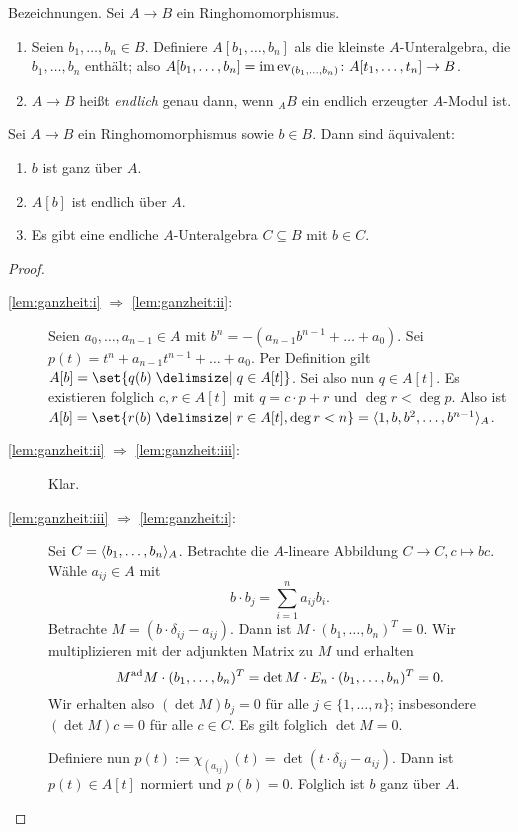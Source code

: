 \documentclass[12pt,a4paper]{scrartcl}
\theoremstyle{cplain}
\theoremstyle{cdef}
\begin{document}
\medskip

Bezeichnungen. Sei $A\to B$ ein Ringhomomorphismus.
\begin{enumerate}
	\item Seien $b_1,\dots,b_n\in B$. Definiere $A[b_1,\dots, b_n]$ als die kleinste $A$-Unteralgebra, die $b_1,\dots, b_n$ enthält; also $A[b_1,\dots, b_n] = \operatorname{im} \operatorname{ev}_{(b_1,\dots, b_n)}\colon A[t_1,\dots, t_n]\to B$.
	\item $A\to B$ heißt \emph{endlich} genau dann, wenn ${}_AB$ ein endlich erzeugter $A$-Modul ist.
\end{enumerate}

\begin{lem} \label{lem:ganzheit}
	Sei $A\to B$ ein Ringhomomorphismus sowie $b\in B$. Dann sind äquivalent:
	\begin{enumerate}
		\item $b$ ist ganz über $A$. \label{lem:ganzheit:i}
		\item $A[b]$ ist endlich über $A$. \label{lem:ganzheit:ii}
		\item Es gibt eine endliche $A$-Unteralgebra $C\subseteq B$ mit $b\in C$. \label{lem:ganzheit:iii}
	\end{enumerate}
\end{lem}


\begin{proof}
	\leavevmode
	\begin{description}
		\item[\ref{lem:ganzheit:i} $\Rightarrow$ \ref{lem:ganzheit:ii}:] Seien $a_0,\dots, a_{n-1}\in A$ mit $b^n = -(a_{n-1}b^{n-1}+\dots+a_0)$. Sei $p(t) = t^n+a_{n-1}t^{n-1}+\dots + a_0$. Per Definition gilt $A[b] = \set{q(b)\given q\in A[t]}$. Sei also nun $q\in A[t]$. Es existieren folglich $c,r\in A[t]$ mit $q = c\cdot p +r $ und $\deg r < \deg p$. Also ist $A[b] = \set{r(b)\given r\in A[t], \deg r <n} = \<1, b, b^2,\dots, b^{n-1}\>_A$.
		
		\item[\ref{lem:ganzheit:ii} $\Rightarrow$ \ref{lem:ganzheit:iii}:] Klar.
		\item[\ref{lem:ganzheit:iii} $\Rightarrow$ \ref{lem:ganzheit:i}:] Sei $C = \langle b_1, \dots, b_n\rangle_A$. Betrachte die $A$-lineare Abbildung $C\to C, c\mapsto bc$. Wähle $a_{ij}\in A$ mit 
		\[b\cdot b_j = \sum_{i=1}^{n}a_{ij}b_i.\]
		Betrachte $M = (b\cdot \delta_{ij}-a_{ij})$. Dann ist $M\cdot (b_1,\dots, b_n)^T = 0$. Wir multiplizieren mit der adjunkten Matrix zu $M$ und erhalten
		\[M^{\operatorname{ad}} M \cdot (b_1,\ldots,b_n)^T = \det M \cdot E_n \cdot (b_1,\dots, b_n)^T = 0.\]
		Wir erhalten also $(\det M)b_j = 0$ für alle $j\in\{1,\dots, n\}$; insbesondere $(\det M)c = 0$ für alle $c\in C$. Es gilt folglich $\det M  = 0$.
		
		Definiere nun $p(t) := \chi_{(a_{ij})}(t) = \det (t\cdot \delta_{ij}-a_{ij})$. Dann ist $p(t)\in A[t]$ normiert und $p(b) = 0$. Folglich ist $b$ ganz über $A$.
		\qedhere
	\end{description}
\end{proof}
\end{document}

